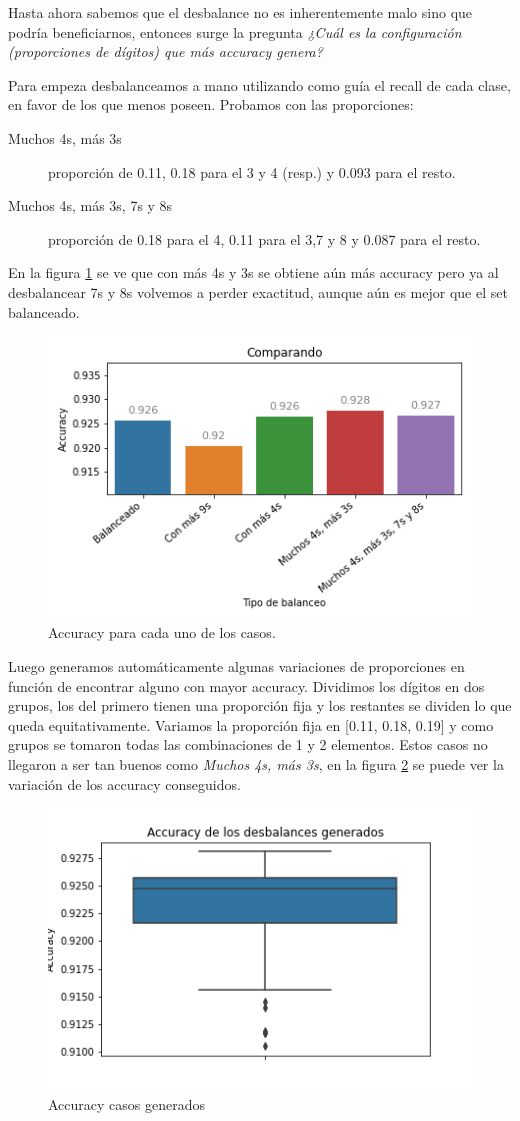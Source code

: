 \FloatBarrier
Hasta ahora sabemos que el desbalance no es inherentemente malo sino que podría beneficiarnos, entonces surge la pregunta \textit{¿Cuál es la configuración (proporciones de dígitos) que más accuracy genera?}

Para empeza desbalanceamos a mano utilizando como guía el recall de cada clase, en favor de los que menos poseen. Probamos con las proporciones: 

\begin{description}
 \item [Muchos 4s, más 3s] proporción de 0.11, 0.18 para el 3 y 4 (resp.) y 0.093 para el resto. 
 \item [Muchos 4s, más 3s, 7s y 8s] proporción de 0.18 para el 4, 0.11 para el 3,7 y 8 y 0.087 para el resto. 
\end{description}

En la figura \ref{fig:acc} se ve que con más 4s y 3s se obtiene aún más accuracy pero ya al desbalancear 7s y 8s volvemos a perder exactitud, aunque aún es mejor que el set balanceado.
\begin{figure}[h]
 \centering
 \includegraphics[width=0.65\linewidth]{images/balanceo/acc.png}
 \caption{Accuracy para cada uno de los casos.}
 \label{fig:acc}
\end{figure}
 
\FloatBarrier
Luego generamos automáticamente algunas variaciones de proporciones en función de encontrar alguno con mayor accuracy. Dividimos los dígitos en dos grupos, los del primero tienen una proporción fija y los restantes se dividen lo que queda equitativamente. Variamos la proporción fija en [0.11, 0.18, 0.19] y como grupos se tomaron todas las combinaciones de 1 y 2 elementos. Estos casos no llegaron a ser tan buenos como \textit{Muchos 4s, más 3s}, en la figura \ref{fig:accAutom} se puede ver la variación de los accuracy conseguidos.

\begin{figure}[h]
 \centering
 \includegraphics[width=0.65\linewidth]{images/balanceo/acc_generados.png}
 \caption{Accuracy casos generados}
 \label{fig:accAutom}
\end{figure}

\FloatBarrier

